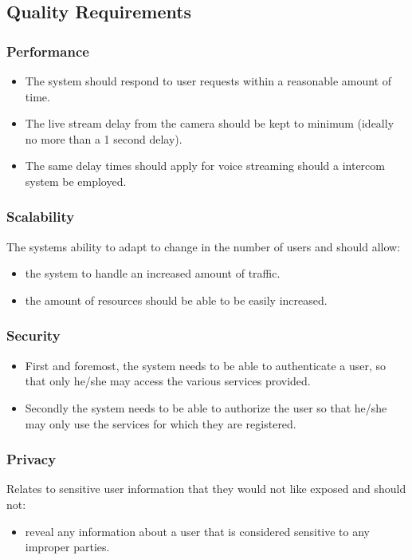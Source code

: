 \documentclass[a4paper,12pt]{article}
\begin{document}
	\subsection{Quality Requirements}
	
	\subsubsection{Performance}
	\begin{itemize}
		\item The system should respond to user requests within a reasonable amount of time.
		\item The live stream delay from the camera should be kept to minimum (ideally no more than a 1 second delay). 
		\item The same delay times should apply for voice streaming should a intercom system be employed.
	\end{itemize}
	
	\subsubsection{Scalability}
	The systems ability to adapt to change in the number of users and should allow:
	\begin{itemize}
		\item the system to handle an increased amount of traffic.
		\item the amount of resources should be able to be easily increased. 
	\end{itemize}
	
	\subsubsection{Security}
	\begin{itemize}
		\item First and foremost, the system needs to be able to authenticate a user, so that only he/she may access the various services provided.
		\item Secondly the system needs to be able to authorize the user so that he/she may only use the services for which they are registered.
	\end{itemize}
	
	\subsubsection{Privacy}
	Relates to sensitive user information that they would not like exposed and should not:
	\begin{itemize}
		\item reveal any information about a user that is considered sensitive to any improper parties.
	\end{itemize}
	
\end{document}
